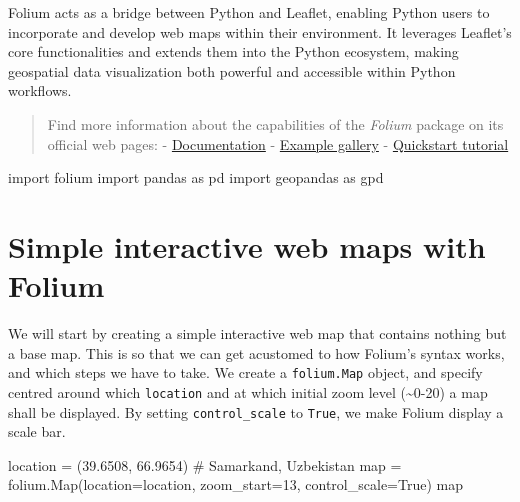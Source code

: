 \documentclass[
  letterpaper,
  DIV=11,
  numbers=noendperiod]{scrreprt}
\newenvironment{Shaded}{\begin{snugshade}}{\end{snugshade}}
\newcommand{\BuiltInTok}[1]{\textcolor[rgb]{0.00,0.23,0.31}{#1}}
\newcommand{\CommentTok}[1]{\textcolor[rgb]{0.37,0.37,0.37}{#1}}
\newcommand{\DecValTok}[1]{\textcolor[rgb]{0.68,0.00,0.00}{#1}}
\newcommand{\FloatTok}[1]{\textcolor[rgb]{0.68,0.00,0.00}{#1}}
\newcommand{\ImportTok}[1]{\textcolor[rgb]{0.00,0.46,0.62}{#1}}
\newcommand{\NormalTok}[1]{\textcolor[rgb]{0.00,0.23,0.31}{#1}}
\newcommand{\OperatorTok}[1]{\textcolor[rgb]{0.37,0.37,0.37}{#1}}
\newcommand{\VariableTok}[1]{\textcolor[rgb]{0.07,0.07,0.07}{#1}}
\begin{document}
Folium acts as a bridge between Python and Leaflet, enabling Python
users to incorporate and develop web maps within their environment. It
leverages Leaflet's core functionalities and extends them into the
Python ecosystem, making geospatial data visualization both powerful and
accessible within Python workflows.

\begin{quote}
Find more information about the capabilities of the \emph{Folium}
package on its official web pages: -
\href{https://python-visualization.github.io/folium/}{Documentation} -
\href{https://nbviewer.org/github/python-visualization/folium/tree/main/examples/}{Example
gallery} -
\href{https://python-visualization.github.io/folium/quickstart.html\#Getting-Started}{Quickstart
tutorial}
\end{quote}

\begin{Shaded}
\begin{Highlighting}[]
\ImportTok{import}\NormalTok{ folium}
\ImportTok{import}\NormalTok{ pandas }\ImportTok{as}\NormalTok{ pd}
\ImportTok{import}\NormalTok{ geopandas }\ImportTok{as}\NormalTok{ gpd}
\end{Highlighting}
\end{Shaded}

\hypertarget{simple-interactive-web-maps-with-folium}{%
\section{Simple interactive web maps with
Folium}\label{simple-interactive-web-maps-with-folium}}

We will start by creating a simple interactive web map that contains
nothing but a base map. This is so that we can get acustomed to how
Folium's syntax works, and which steps we have to take. We create a
\texttt{folium.Map} object, and specify centred around which
\texttt{location} and at which initial zoom level (\textasciitilde0-20)
a map shall be displayed. By setting \texttt{control\_scale} to
\texttt{True}, we make Folium display a scale bar.

\begin{Shaded}
\begin{Highlighting}[]
\NormalTok{location }\OperatorTok{=}\NormalTok{ (}\FloatTok{39.6508}\NormalTok{, }\FloatTok{66.9654}\NormalTok{) }\CommentTok{\# Samarkand, Uzbekistan}
\BuiltInTok{map} \OperatorTok{=}\NormalTok{ folium.Map(location}\OperatorTok{=}\NormalTok{location, zoom\_start}\OperatorTok{=}\DecValTok{13}\NormalTok{, control\_scale}\OperatorTok{=}\VariableTok{True}\NormalTok{)}
\BuiltInTok{map}
\end{Highlighting}
\end{Shaded}
\end{document}
